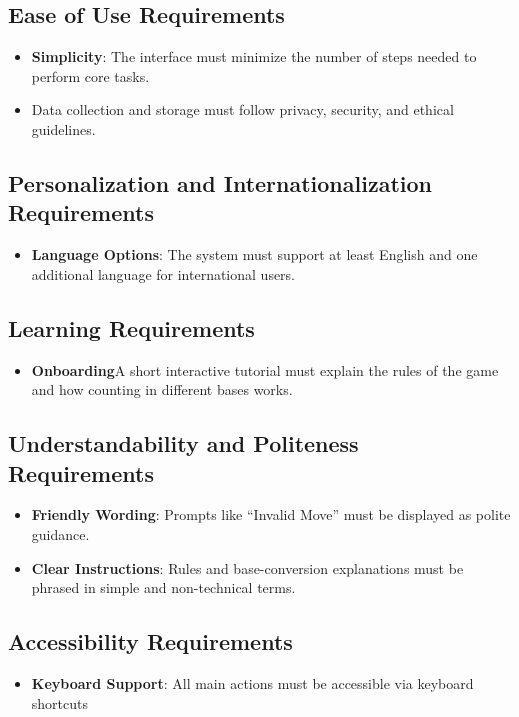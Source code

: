 \documentclass[12pt]{article}
\begin{document}
\subsection{Ease of Use Requirements}
	\begin{itemize}
		\item \textbf{Simplicity}: The interface must minimize the number of steps needed to perform core tasks.
		\item Data collection and storage must follow privacy, security, and ethical guidelines.
	\end{itemize}
\subsection{Personalization and Internationalization Requirements}
	\begin{itemize}
		\item \textbf{Language Options}: The system must support at least English and one additional language for international users.
	\end{itemize}
\subsection{Learning Requirements}
	\begin{itemize}
		\item \textbf{Onboarding}A short interactive tutorial must explain the rules of the game and how counting in different bases works.
	\end{itemize}
\subsection{Understandability and Politeness Requirements}
	\begin{itemize}
		\item \textbf{Friendly Wording}: Prompts like “Invalid Move” must be displayed as polite guidance.
		\item \textbf{Clear Instructions}: Rules and base-conversion explanations must be phrased in simple and non-technical terms.
	\end{itemize}
\subsection{Accessibility Requirements}
	\begin{itemize}
		\item\textbf{Keyboard Support}: All main actions must be accessible via keyboard shortcuts
	\end{itemize}
\end{document}
